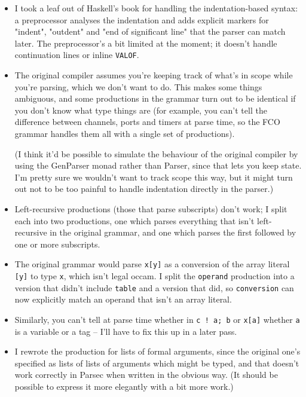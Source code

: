 \documentclass[a4paper,12pt]{article}
\def\occam{{\sffamily occam}\xspace}
\begin{document}
\begin{itemize}

\item I took a leaf out of Haskell's book for handling the
indentation-based syntax: a preprocessor analyses the indentation and
adds explicit markers for "indent", "outdent" and "end of significant
line" that the parser can match later. The preprocessor's a bit limited
at the moment; it doesn't handle continuation lines or inline
\verb|VALOF|.

\item The original compiler assumes you're keeping track of what's in
scope while you're parsing, which we don't want to do. This makes some
things ambiguous, and some productions in the grammar turn out to be
identical if you don't know what type things are (for example, you can't
tell the difference between channels, ports and timers at parse time, so
the FCO grammar handles them all with a single set of productions).

(I think it'd be possible to simulate the behaviour of the original
compiler by using the GenParser monad rather than Parser, since that
lets you keep state. I'm pretty sure we wouldn't want to track scope
this way, but it might turn out not to be too painful to handle
indentation directly in the parser.)

\item Left-recursive productions (those that parse subscripts) don't
work; I split each into two productions, one which parses everything
that isn't left-recursive in the original grammar, and one which parses
the first followed by one or more subscripts.

\item The original grammar would parse \verb|x[y]| as a conversion of
the array literal \verb|[y]| to type \verb|x|, which isn't legal \occam.
I split the \verb|operand| production into a version that didn't include
\verb|table| and a version that did, so \verb|conversion| can now
explicitly match an operand that isn't an array literal.

\item Similarly, you can't tell at parse time whether in \verb|c ! a; b|
or \verb|x[a]| whether \verb|a| is a variable or a tag -- I'll have to
fix this up in a later pass.

\item I rewrote the production for lists of formal arguments, since the
original one's specified as lists of lists of arguments which might be
typed, and that doesn't work correctly in Parsec when written in the
obvious way. (It should be possible to express it more elegantly with a
bit more work.)

\end{itemize}
\end{document}
